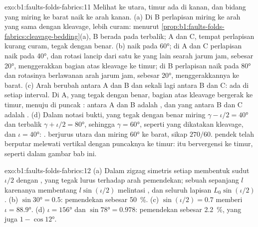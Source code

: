 \begin{solution}{exo:b1:faults-folds-fabrics:11}
Melihat ke utara, timur ada di kanan, dan bidang yang miring ke barat naik ke arah kanan. (a) Di B perlapisan miring ke arah yang sama dengan kleavage, lebih curam: menurut \cref{prop:b1:faults-folds-fabrics:cleavage-bedding}(a), B berada pada  terbalik; A dan C, tempat perlapisan kurang curam, tegak dengan benar. (b)  naik pada \ang{60}; di A dan C perlapisan naik pada \ang{40}, dan rotasi lancip dari satu ke yang lain searah jarum jam, sebesar \ang{20}, menggerakkan bagian atas kleavage ke timur; di B perlapisan naik pada \ang{80} dan rotasinya berlawanan arah jarum jam, sebesar \ang{20}, menggerakkannya ke barat. (c) Arah berubah antara A dan B dan sekali lagi antara B dan C: ada  di setiap interval. Di A, yang tegak dengan benar, bagian atas kleavage bergerak ke timur, menuju  di puncak :  antara A dan B adalah , dan yang antara B dan C adalah . (d) Dalam notasi bukti,  yang tegak dengan benar miring $\gamma - \iota/2 = \ang{40}$ dan  terbalik $\gamma + \iota/2 =
\ang{80}$, sehingga $\gamma = \ang{60}$, seperti yang dikatakan kleavage, dan $\iota =
\ang{40}$: .  berjurus utara dan miring \ang{60} ke barat, sikap $270/60$.  pendek telah berputar melewati vertikal dengan puncaknya ke timur:  itu bervergensi ke timur, seperti dalam gambar bab ini.
\end{solution}

\begin{solution}{exo:b1:faults-folds-fabrics:12}
(a) Dalam  zigzag simetris setiap  membentuk sudut $\iota/2$ dengan , yang tegak lurus terhadap arah pemendekan; sebuah  sepanjang $l$ karenanya membentang $l\sin(\iota/2)$ melintasi , dan seluruh lapisan $L_0\sin(\iota/2)$. (b) $\sin\ang{30} = 0.5$: pemendekan sebesar \qty{50}{\percent}. (c) $\sin(\iota/2) = 0.7$ memberi $\iota = \ang{88.9}$.
(d) $\iota = \ang{156}$ dan $\sin\ang{78} = 0.978$: pemendekan sebesar \qty{2.2}{\percent}, yang juga $1 - \cos\ang{12}$.
\end{solution}

